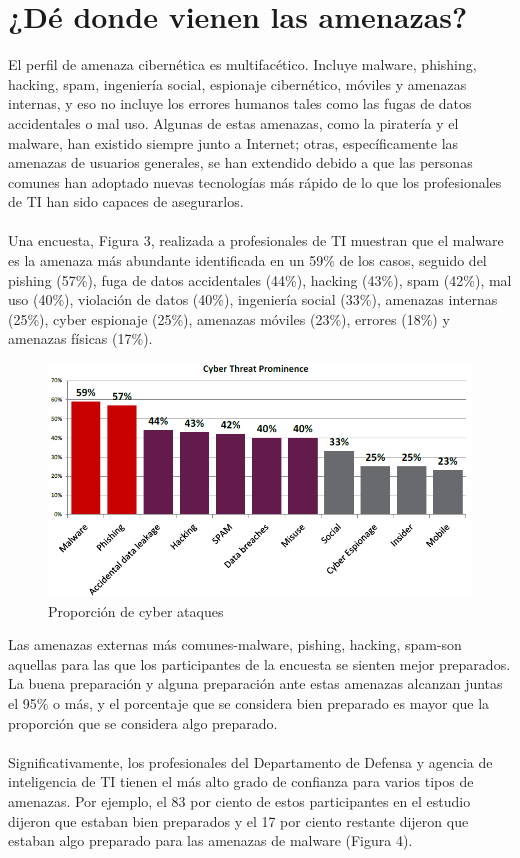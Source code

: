 \documentclass[journal]{IEEEtran}
\begin{document}
\section{¿Dé donde vienen las amenazas?}
El perfil de amenaza cibernética es multifacético. Incluye malware, phishing, hacking, spam, ingeniería social, espionaje cibernético, móviles y amenazas internas, y eso no incluye los errores humanos tales como las fugas de datos accidentales o mal uso. Algunas de estas amenazas, como la piratería y el malware, han existido siempre junto a Internet; otras, específicamente las amenazas de usuarios generales, se han extendido debido a que las personas comunes han adoptado nuevas tecnologías más rápido de lo que los profesionales de TI han sido capaces de asegurarlos.\\ \\
Una encuesta, Figura 3, realizada a profesionales de TI muestran que el malware es la amenaza más abundante identificada en un 59\% de los casos, seguido del pishing (57\%), fuga de datos accidentales (44\%), hacking (43\%), spam (42\%), mal uso (40\%), violación de datos (40\%), ingeniería social (33\%), amenazas internas (25\%), cyber espionaje (25\%), amenazas móviles (23\%), errores (18\%) y amenazas físicas (17\%).

\begin{figure}[htb]
\centering
\includegraphics[width=0.40\paperwidth]{img1.png}
\caption{Proporción de cyber ataques}%
\end{figure}

Las amenazas externas más comunes-malware, pishing, hacking, spam-son aquellas para las que los participantes de la encuesta se sienten mejor preparados. La buena preparación y alguna preparación ante estas amenazas alcanzan juntas el 95\% o más, y el porcentaje que se considera bien preparado es mayor que la proporción que se considera algo preparado.\\ \\
Significativamente, los profesionales del Departamento de Defensa y agencia de inteligencia de TI tienen el más alto grado de confianza para varios tipos de amenazas. Por ejemplo, el 83 por ciento de estos participantes en el estudio dijeron que estaban bien preparados y el 17 por ciento restante dijeron que estaban algo preparado para las amenazas de malware (Figura 4).
\end{document}
